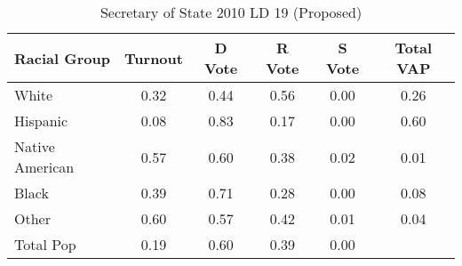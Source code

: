 \begin{table}[htb]
\begin{center}
\caption{Secretary of State 2010 LD 19 (Proposed)}
\label{sos10_vap_ld_19}
\begin{tabular}{lccccc}
  \hline
Racial Group & Turnout & D Vote & R Vote & S Vote & Total VAP \\ 
  \hline
White & 0.32 & 0.44 & 0.56 & 0.00 & 0.26 \\ 
  Hispanic & 0.08 & 0.83 & 0.17 & 0.00 & 0.60 \\ 
  Native American & 0.57 & 0.60 & 0.38 & 0.02 & 0.01 \\ 
  Black & 0.39 & 0.71 & 0.28 & 0.00 & 0.08 \\ 
  Other & 0.60 & 0.57 & 0.42 & 0.01 & 0.04 \\ 
  Total Pop & 0.19 & 0.60 & 0.39 & 0.00 &  \\ 
   \hline
\end{tabular}
\end{center}
\end{table}
